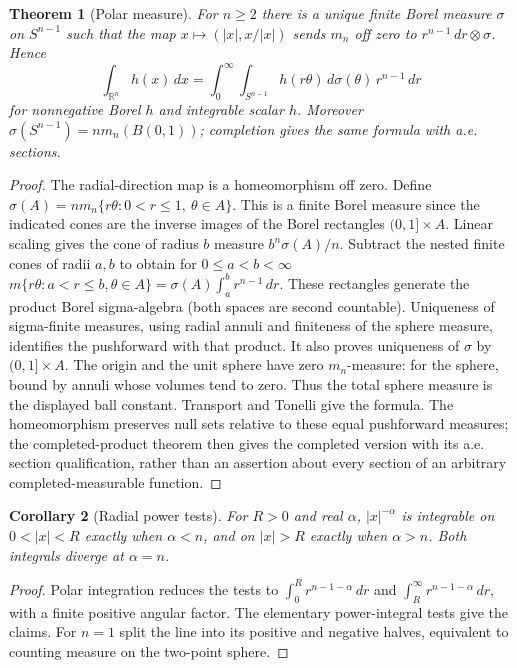 \documentclass[11pt,oneside,openany]{book}
\newtheorem{theorem}{Theorem}[chapter]
\newtheorem{corollary}[theorem]{Corollary}
\theoremstyle{definition}
\theoremstyle{remark}
\newcommand{\R}{\mathbb R}\newcommand{\C}{\mathbb C}
\newcommand{\family}[1]{}
\begin{document}
\begin{theorem}[Polar measure]\family{D11.09.polar_measure}\label{d11:09:polar-measure}
For $n\geq2$ there is a unique finite Borel measure $\sigma$ on $S^{n-1}$
such that the map $x\mapsto(|x|,x/|x|)$ sends $m_n$ off zero to
$r^{n-1}\,dr\otimes\sigma$. Hence
\[
 \int_{\R^n}h(x)\,dx=\int_0^\infty\int_{S^{n-1}}
 h(r\theta)\,d\sigma(\theta)\,r^{n-1}\,dr
\]
for nonnegative Borel $h$ and integrable scalar $h$.
Moreover $\sigma(S^{n-1})=n m_n(B(0,1))$; completion gives the same
formula with a.e. sections.
\end{theorem}
\begin{proof}
The radial-direction map is a homeomorphism off zero. Define
$\sigma(A)=n m_n\{r\theta:0<r\leq1,\ \theta\in A\}$.
This is a finite Borel measure since the indicated cones are the inverse
images of the Borel rectangles $(0,1]\times A$. Linear scaling gives
the cone of radius $b$ measure $b^n\sigma(A)/n$. Subtract the nested finite
cones of radii $a,b$ to obtain for $0\leq a<b<\infty$
$m\{r\theta:a<r\leq b,\theta\in A\}
=\sigma(A)\int_a^b r^{n-1}\,dr$.
These rectangles generate the product Borel sigma-algebra (both spaces
are second countable). Uniqueness of sigma-finite measures, using radial
annuli and finiteness of the sphere measure, identifies the pushforward
with that product. It also proves uniqueness of $\sigma$ by $(0,1]\times A$.
The origin and the unit sphere have zero $m_n$-measure: for the sphere,
bound by annuli whose volumes tend to zero. Thus the total sphere measure
is the displayed ball constant. Transport and Tonelli give the formula.
The homeomorphism preserves null sets relative to these equal pushforward
measures; the completed-product theorem then gives the completed version
with its a.e. section qualification, rather than an assertion about every
section of an arbitrary completed-measurable function.
\end{proof}

\begin{corollary}[Radial power tests]\family{D11.09.radial_integrability}\label{d11:09:radial-integrability}
For $R>0$ and real $\alpha$, $|x|^{-\alpha}$ is integrable on
$0<|x|<R$ exactly when $\alpha<n$, and on $|x|>R$ exactly when
$\alpha>n$. Both integrals diverge at $\alpha=n$.
\end{corollary}
\begin{proof}
Polar integration reduces the tests to
$\int_0^R r^{n-1-\alpha}\,dr$ and
$\int_R^\infty r^{n-1-\alpha}\,dr$, with a finite positive angular factor.
The elementary power-integral tests give the claims. For $n=1$ split the
line into its positive and negative halves, equivalent to counting measure
on the two-point sphere.
\end{proof}
\end{document}
